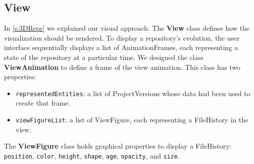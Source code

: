 \subsection{View}
\label{s:view_impl}
In \autoref{s:3DRepr} we explained our visual approach. The \textbf{View} class defines how the visualization should be rendered. 
To display a repository's evolution, the user interface sequentially displays a list of AnimationFrames, each representing a state of the repository at a particular time. We designed the class \textbf{ViewAnimation} to define a frame of the view animation. This class has two properties:
\begin{itemize}
    \item \texttt{representedEntities}: a list of ProjectVersions whose data had been used to create that frame.
    \item \texttt{viewFigureList}: a list of ViewFigure, each representing a FileHistory in the view.
\end{itemize}

The \textbf{ViewFigure} class holds graphical properties to display a FileHistory: \texttt{position}, \texttt{color}, \texttt{height}, \texttt{shape}, \texttt{age}, \texttt{opacity}, and \texttt{size}.

